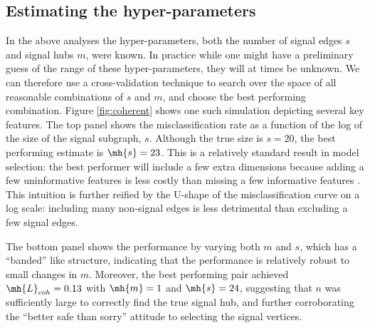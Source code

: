 \documentclass[10pt,journal,cspaper,compsoc]{IEEEtran}
\begin{document}
\subsection{Estimating the hyper-parameters} %
\label{sub:estimating_the_hyper_parameters}

In the above analyses the hyper-parameters, both the number of signal edges $s$ and signal hubs $m$, were known.  In practice while one might have a preliminary guess of the range of these hyper-parameters, they will at times be unknown.  We can therefore use a cross-validation technique to search over the space of all reasonable combinations of $s$ and $m$, and choose the best performing combination.  Figure \ref{fig:coherent} shows one such simulation depicting several key features.  The top panel shows the misclassification rate as a function of the log of the size of the signal subgraph, $s$.  Although the true size is $s=20$, the best performing estimate is $\mh{s}=23$. This is a relatively standard result in model selection: the best performer will include a few extra dimensions because adding a few uninformative features is less costly than missing a few informative features \cite{Jain2000}.  This intuition is further reified by the U-shape of the misclassification curve on a log scale: including many non-signal edges is less detrimental than excluding a few signal edges.

The bottom panel shows the performance by varying both $m$ and $s$, which has a ``banded'' like structure, indicating that the performance is relatively robust to small changes in $m$.  Moreover, the best performing pair achieved $\mh{L}_{coh}=0.13$ with $\mh{m}=1$ and $\mh{s}=24$, suggesting that $n$ was sufficiently large to correctly find the true signal hub, and further corroborating the ``better safe than sorry'' attitude to selecting the signal vertices. 
\end{document}
